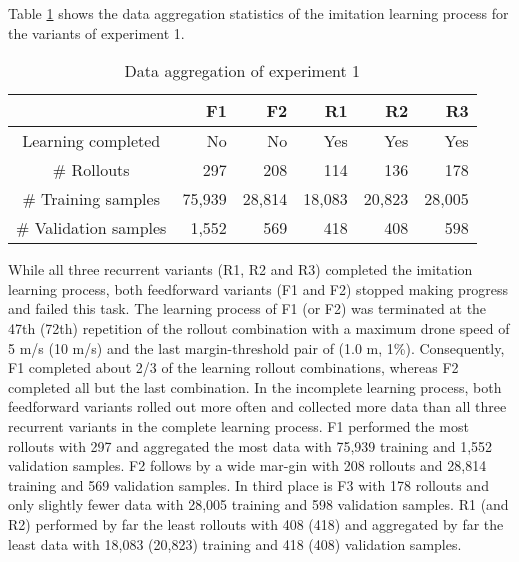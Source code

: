 Table \ref{tab:e1_data} shows the data aggregation statistics of the imitation learning 
process for the variants of experiment 1. 
\begin{table}[h]
    \caption[
        Data aggregation of experiment 1
    ]{
        Data aggregation of experiment 1
        \label{tab:e1_data}}        
    \centering
    \begin{tabular}{|c|r|r|r|r|r|} 
        \cline{2-6}
        \multicolumn{1}{c|}{}
        &F1
        &F2
        &R1
        &R2
        &R3
        \\\hline
        Learning completed
        &No
        &No
        &Yes
        &Yes
        &Yes
        \\\hline
        \# Rollouts
        &297
        &208
        &114
        &136
        &178
        \\\hline
        \# Training samples
        &75,939
        &28,814
        &18,083
        &20,823
        &28,005
        \\\hline
        \# Validation samples
        &1,552
        &569
        &418
        &408
        &598
        \\\hline
    \end{tabular}
\end{table}
While all three recurrent variants (R1, R2 and R3) 
completed the imitation learning process, 
both feedforward variants (F1 and F2) stopped making progress and 
failed this task. The learning process of F1 (or F2) was terminated at the 
47th (72th) repetition of the rollout combination with a maximum drone speed 
of 5 m/s (10 m/s) and the last margin-threshold pair of (1.0 m, 1\%). 
Consequently, F1 completed about 2/3 of the learning rollout combinations, 
whereas F2 completed all but the last combination. In the incomplete learning process, 
both feedforward variants rolled out more often and collected more data than all 
three recurrent variants in the complete learning process. F1 performed the most 
rollouts with 297 and aggregated the most data with 75,939 training and 1,552 validation 
samples. F2 follows by a wide mar-gin with 208 rollouts and 28,814 training and 
569 validation samples. In third place is F3 with 178 rollouts and only slightly 
fewer data with 28,005 training and 598 validation samples. R1 (and R2) performed by 
far the least rollouts with 408 (418) and aggregated by far the least data with 
18,083 (20,823) training and 418 (408) validation samples.






